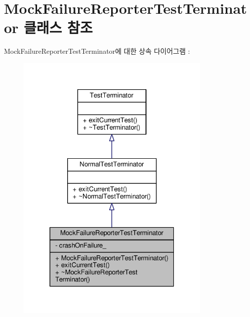 \hypertarget{class_mock_failure_reporter_test_terminator}{}\section{Mock\+Failure\+Reporter\+Test\+Terminator 클래스 참조}
\label{class_mock_failure_reporter_test_terminator}


Mock\+Failure\+Reporter\+Test\+Terminator에 대한 상속 다이어그램 \+: 
\nopagebreak
\begin{figure}[H]
\begin{center}
\leavevmode
\includegraphics[width=268pt]{class_mock_failure_reporter_test_terminator__inherit__graph}
\end{center}
\end{figure}


